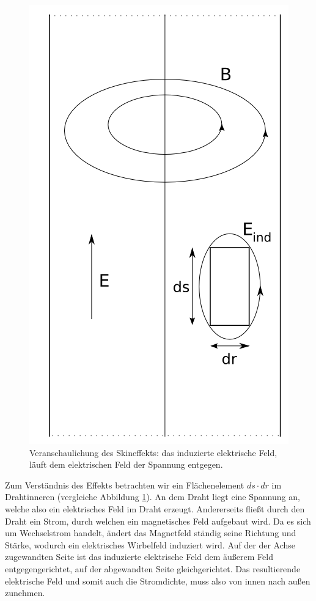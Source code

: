 \begin{figure}[tbhn]
\begin{center}
\noindent
\includegraphics[scale=0.35]{Skineffekt.png}
\end{center}
\caption{Veranschaulichung des Skineffekts: das induzierte elektrische Feld, läuft dem elektrischen Feld der Spannung entgegen.}
\label{pic:skineffekt}
\end{figure}

Zum Verständnis des Effekts betrachten wir ein Flächenelement $ds \cdot dr$ im Drahtinneren (vergleiche Abbildung \ref{pic:skineffekt}).
An dem Draht liegt eine Spannung an, welche also ein elektrisches Feld im Draht erzeugt.
Andererseits fließt durch den Draht ein Strom, durch welchen ein magnetisches Feld aufgebaut wird.
Da es sich um Wechselstrom handelt, ändert das Magnetfeld ständig seine Richtung und Stärke, wodurch ein elektrisches Wirbelfeld induziert wird.
Auf der der Achse zugewandten Seite ist das induzierte elektrische Feld dem äußerem Feld entgegengerichtet, auf der abgewandten Seite gleichgerichtet.
Das resultierende elektrische Feld und somit auch die Stromdichte, muss also von innen nach außen zunehmen.\cite{Gerthsen}

